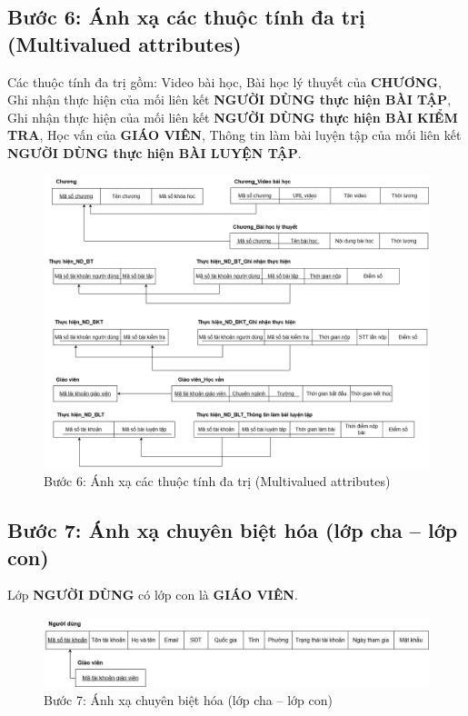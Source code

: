 \subsection{Bước 6: Ánh xạ các thuộc tính đa trị (Multivalued	attributes)} \vspace{-4pt}
Các thuộc tính đa trị gồm: Video bài học, Bài học lý thuyết của \textbf{CHƯƠNG}, Ghi nhận thực hiện của mối liên kết \textbf{NGƯỜI DÙNG thực hiện BÀI TẬP}, Ghi nhận thực hiện của mối liên kết \textbf{NGƯỜI DÙNG thực hiện BÀI KIỂM TRA}, Học vấn của \textbf{GIÁO VIÊN}, Thông tin làm bài luyện tập của mối liên kết \textbf{NGƯỜI DÙNG thực hiện BÀI LUYỆN TẬP}.
\begin{figure}[H]
    \centering
    \includegraphics[width=1\linewidth]{picture/datri.png}
    \caption{Bước 6: Ánh xạ các thuộc tính đa trị (Multivalued	attributes)}
    \label{fig:placeholder}
\end{figure}
\subsection{Bước 7: Ánh xạ chuyên biệt hóa (lớp cha – lớp con)}
Lớp \textbf{NGƯỜI DÙNG} có lớp con là \textbf{GIÁO VIÊN}.
\begin{figure}[H]
    \centering
    \includegraphics[width=1\linewidth]{picture/chacon.jpg}
    \caption{Bước 7: Ánh xạ chuyên biệt hóa (lớp cha – lớp con)}
    \label{fig:placeholder}
\end{figure}